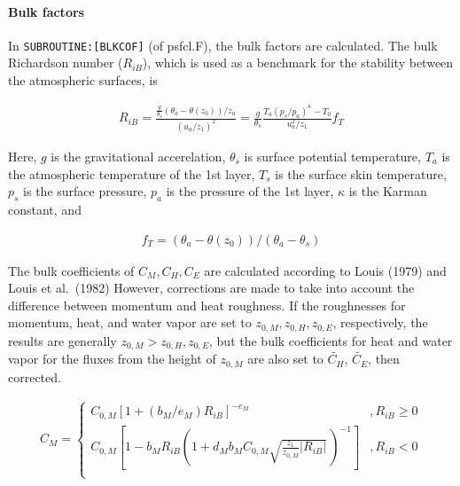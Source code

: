 \hypertarget{bulk-factors}{%
\paragraph{Bulk factors}\label{bulk-factors}}

In \texttt{SUBROUTINE:{[}BLKCOF{]}} (of psfcl.F), the bulk factors are
calculated. The bulk Richardson number (\(R_{iB}\)), which is used as a
benchmark for the stability between the atmospheric surfaces, is

\begin{eqnarray}
R_{iB} =
            \frac{ \frac{g}{\theta_s} (\theta_a - \theta(z_0))/z_a }
              { (u_a/z_1)^2                                  }
       = \frac{g}{\theta_s}
         \frac{T_a (p_s/p_a)^\kappa - T_0 }{u_a^2/z_1} f_T
\end{eqnarray}

Here, \(g\) is the gravitational accerelation, \(\theta_s\) is surface
potential temperature, \(T_a\) is the atmospheric temperature of the 1st
layer, \(T_s\) is the surface skin temperature, \(p_s\) is the surface
pressure, \(p_a\) is the pressure of the 1st layer, \(\kappa\) is the
Karman constant, and

\begin{eqnarray}
f_T = (\theta_a - \theta(z_0))/(\theta_a - \theta_s)
\end{eqnarray}

The bulk coefficients of \(C_M,C_H,C_E\) are calculated according to
Louis (1979) and Louis et al.~(1982) However, corrections are made to
take into account the difference between momentum and heat roughness. If
the roughnesses for momentum, heat, and water vapor are set to
\(z_{0,M}, z_{0,H}, z_{0,E}\), respectively, the results are generally
\(z_{0,M} > z_{0,H}, z_{0,E}\), but the bulk coefficients for heat and
water vapor for the fluxes from the height of \(z_{0,M}\) are also set
to \(\widetilde{C_H}\), \(\widetilde{C_E}\), then corrected.

\begin{eqnarray}
    C_M = \left\{
      \begin{array}{lr}
      C_{0,M} [ 1 + (b_M/e_M)  R_{iB} ]^{-e_M}
            &,
          R_{iB} \geq 0 \\
      C_{0,M} \left[ 1 - b_M R_{iB} \left( 1+ d_M b_M C_{0,M}
                                  \sqrt{\frac{z_1}{z_{0,M}}| R_{iB}|} \,
                                  \right)^{-1} \right]     
          &,
          R_{iB} < 0 \\
      \end{array} \right.
\end{eqnarray}


